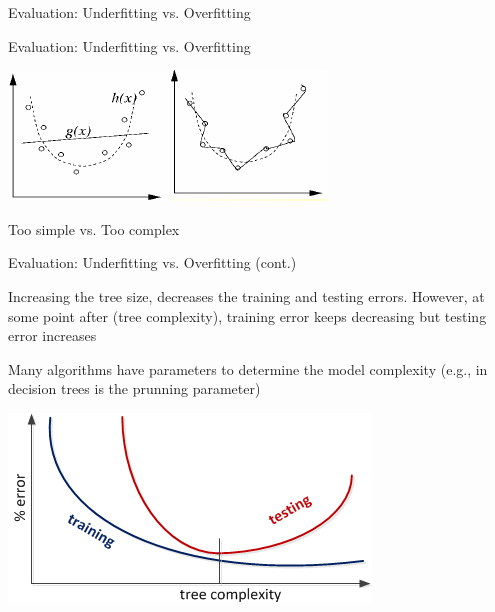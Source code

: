 \documentclass{beamer}
\begin{document}
\begin{frame}{Evaluation: Underfitting vs. Overfitting}

Evaluation: Underfitting vs. Overfitting

\begin{center}
\includegraphics[width=.35\textwidth]{figs/underfitting}
\includegraphics[width=.35\textwidth]{figs/overfitting}

Too simple vs. Too complex
\end{center}

\end{frame}


\begin{frame}{Evaluation: Underfitting vs. Overfitting (cont.)}

Increasing the tree size, decreases the training and testing errors. However, at some point after (tree complexity), training error keeps decreasing but testing error increases

Many algorithms have parameters to determine the model complexity (e.g., in decision trees is the prunning parameter)

\begin{center}
\includegraphics[width=.6\textwidth]{figs/overFittingDecisionTress}
\end{center}


\end{frame}
\end{document}
